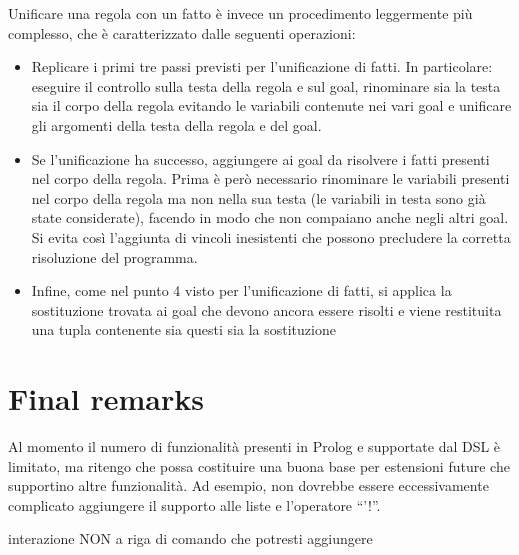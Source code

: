 Unificare una regola con un fatto è invece un procedimento leggermente più complesso, che è caratterizzato dalle seguenti operazioni:

\begin{itemize}
\item Replicare i primi tre passi previsti per l'unificazione di fatti. In particolare: eseguire il controllo sulla testa della regola e sul goal, rinominare sia la testa sia il corpo della regola evitando le variabili contenute nei vari goal e unificare gli argomenti della testa della regola e del goal.
\item Se l'unificazione ha successo, aggiungere ai goal da risolvere i fatti presenti nel corpo della regola. Prima è però necessario rinominare le variabili presenti nel corpo della regola ma non nella sua testa (le variabili in testa sono già state considerate), facendo in modo che non compaiano anche negli altri goal. Si evita così l'aggiunta di vincoli inesistenti che possono precludere la corretta risoluzione del programma.
\item Infine, come nel punto 4 visto per l'unificazione di fatti, si applica la sostituzione trovata ai goal che devono ancora essere risolti e viene restituita una tupla contenente sia questi sia la sostituzione
\end{itemize}


\section{Final remarks}

Al momento il numero di funzionalità presenti in Prolog e supportate dal DSL è limitato, ma ritengo che possa costituire una buona base per estensioni future che supportino altre funzionalità. Ad esempio, non dovrebbe essere eccessivamente complicato aggiungere il supporto alle liste e l'operatore ``'!''.


interazione NON a riga di comando che potresti aggiungere
